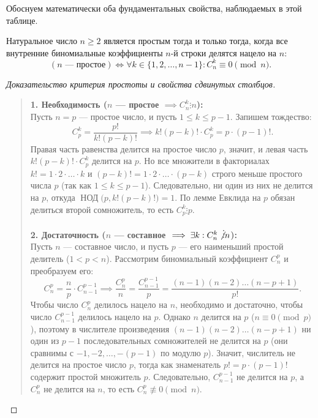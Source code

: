 Обоснуем математически оба фундаментальных свойства, наблюдаемых в этой 
таблице.

\begin{theorem}
    Натуральное число $n \ge 2$ является простым тогда и только тогда, 
    когда все внутренние биномиальные коэффициенты $n$-й строки делятся 
    нацело на $n$:
    \begin{equation} \label{eq:prime_binom_crit}
        (n \text{ --- простое}) \iff 
        \forall k \in \{1, 2, \dots, n - 1\} : C_n^k \equiv 0 \pmod{n}. \tag{13}
    \end{equation}
\end{theorem}

\begin{proof}[Доказательство критерия простоты и свойства сдвинутых столбцов]~\\
    \begin{quote}
        \textbf{1. Необходимость ($n$ --- простое $\implies C_n^k \vdots n$):}\\
        Пусть $n = p$ --- простое число, и пусть $1 \le k \le p - 1$. 
        Запишем тождество:
        \[
            C_p^k = \frac{p!}{k!(p - k)!} \implies 
            k!(p - k)! \cdot C_p^k = p \cdot (p - 1)!.
        \]
        Правая часть равенства делится на простое число $p$, значит, и 
        левая часть $k!(p - k)! \cdot C_p^k$ делится на $p$. Но все 
        множители в факториалах $k! = 1 \cdot 2 \cdot \dots \cdot k$ и 
        $(p - k)! = 1 \cdot 2 \cdot \dots \cdot (p - k)$ строго меньше 
        простого числа $p$ (так как $1 \le k \le p - 1$). Следовательно, 
        ни один из них не делится на $p$, откуда 
        $\operatorname{НОД}\bigl(p, k!(p - k)!\bigr) = 1$. По лемме Евклида 
        на $p$ обязан делиться второй сомножитель, то есть $C_p^k \vdots p$.

        \textbf{2. Достаточность ($n$ --- составное $\implies \exists k : 
        C_n^k \not\vdots n$):}\\
        Пусть $n$ --- составное число, и пусть $p$ --- его наименьший 
        простой делитель ($1 < p < n$). Рассмотрим биномиальный коэффициент 
        $C_n^p$ и преобразуем его:
        \[
            C_n^p = \frac{n}{p} \cdot C_{n-1}^{p-1} \implies 
            \frac{C_n^p}{n} = \frac{C_{n-1}^{p-1}}{p} = 
            \frac{(n - 1)(n - 2) \dots (n - p + 1)}{p!}.
        \]
        Чтобы число $C_n^p$ делилось нацело на $n$, необходимо и 
        достаточно, чтобы число $C_{n-1}^{p-1}$ делилось нацело на $p$. 
        Однако $n$ делится на $p$ ($n \equiv 0 \pmod{p}$), поэтому в 
        числителе произведения $(n - 1)(n - 2) \dots (n - p + 1)$ ни один 
        из $p - 1$ последовательных сомножителей не делится на $p$ (они 
        сравнимы с $-1, -2, \dots, -(p - 1)$ по модулю $p$). Значит, 
        числитель не делится на простое число $p$, тогда как знаменатель 
        $p! = p \cdot (p - 1)!$ содержит простой множитель $p$. 
        Следовательно, $C_{n-1}^{p-1}$ не делится на $p$, а $C_n^p$ не 
        делится на $n$, то есть $C_n^p \not\equiv 0 \pmod{n}$.


\end{quote}
\end{proof}
